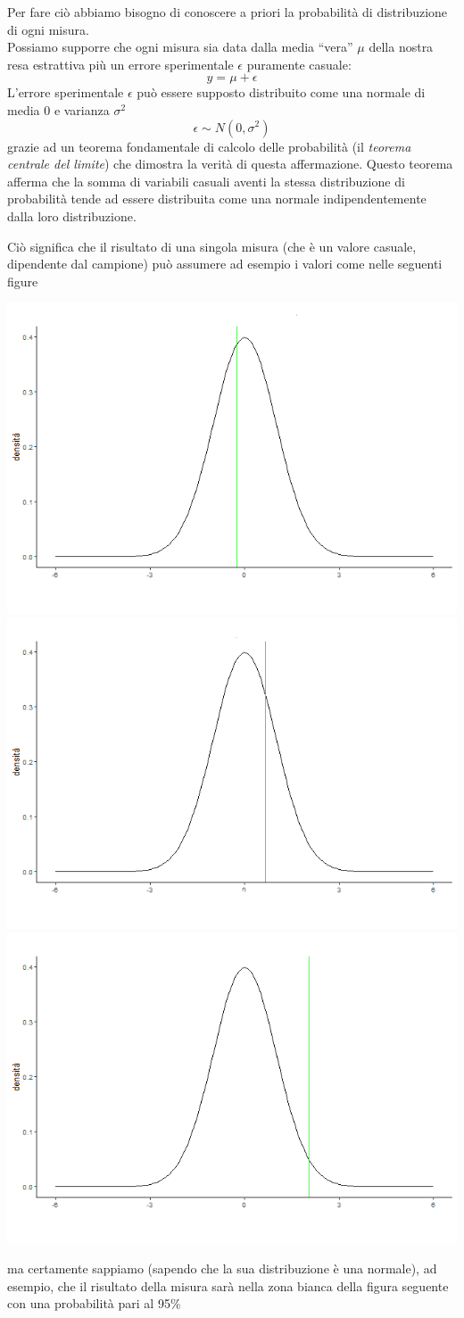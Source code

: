 \documentclass[
  11pt,
]{book}
\begin{document}
Per fare ciò abbiamo bisogno di conoscere a priori la probabilità di distribuzione di ogni misura.\\
Possiamo supporre che ogni misura sia data dalla media ``vera'' \(\mu\) della nostra resa estrattiva più un errore sperimentale \(\epsilon\) puramente casuale:
\[
y=\mu+\epsilon
\]
L'errore sperimentale \(\epsilon\) può essere supposto distribuito come una normale di media \(0\) e varianza \(\sigma^2\)
\[
\epsilon \sim N(0,\sigma^2)
\]
grazie ad un teorema fondamentale di calcolo delle probabilità (il \emph{teorema centrale del limite}) che dimostra la verità di questa affermazione. Questo teorema afferma che la somma di variabili casuali aventi la stessa distribuzione di probabilità tende ad essere distribuita come una normale indipendentemente dalla loro distribuzione.

Ciò significa che il risultato di una singola misura (che è un valore casuale, dipendente dal campione) può assumere ad esempio i valori come nelle seguenti figure

\includegraphics[width=0.35\linewidth]{Immagini/Inferenziale/misura1}
\includegraphics[width=0.35\linewidth]{Immagini/Inferenziale/misura2}
\includegraphics[width=0.35\linewidth]{Immagini/Inferenziale/misura3}

ma certamente sappiamo (sapendo che la sua distribuzione è una normale), ad esempio, che il risultato della misura sarà nella zona bianca della figura seguente con una probabilità pari al 95\%
\end{document}
